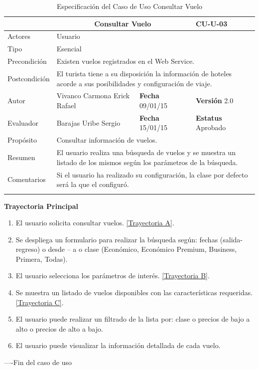 \begin{longtable}{|p{2.5cm}|p{6.4cm}|p{2cm}|p{2cm}|}
	\hline
		\rowcolor[RGB]{51,153,255}{Caso de Uso}&\multicolumn{2}{c}{Consultar Vuelo}&{\textbf{CU-U-03}}\\
	\hline
		{Actores}&\multicolumn{3}{p{11.2cm}|}{Usuario}\\
	\hline
		{Tipo}&\multicolumn{3}{p{11.2cm}|}{Esencial}\\
	\hline
		{Precondición}&\multicolumn{3}{p{11.2cm}|}{Existen vuelos registrados en el Web Service.}\\
	\hline
		{Postcondición}&\multicolumn{3}{p{11.2cm}|}{El turista tiene a su disposición la información de hoteles acorde a sus posibilidades y configuración de viaje.}\\
	\hline
		{Autor}&{Vivanco Carmona Erick Rafael}&{\textbf{Fecha} 09/01/15}&{\textbf{Versión} 2.0}\\
			\hline
		{Evaluador}&{Barajas Uribe Sergio}&{\textbf{Fecha} 15/01/15}&{\textbf{Estatus} Aprobado}\\
	\hline
		{Propósito}&\multicolumn{3}{p{11.2cm}|}{Consultar información de vuelos.}\\
	\hline
		{Resumen}&\multicolumn{3}{p{11.2cm}|}{El usuario realiza una búsqueda de vuelos y se muestra un listado de los mismos según los parámetros de la búsqueda.}\\	
	\hline
		{Comentarios}&\multicolumn{3}{p{11.2cm}|}{Si el usuario ha realizado su configuración, la clase por defecto será la que el configuró.}\\	
	\hline
	\caption[Especificación del Caso de Uso Consultar Vuelo]{Especificación del Caso de Uso Consultar Vuelo}
    	\label{tab:cuConsultarVuelo}
\end{longtable}
\newpage
\begin{flushleft}
	\textbf{Trayectoria Principal}\\
	\begin{enumerate}
		\item El usuario solicita consultar vuelos. \hyperlink{TrayectoriaA_CU-U-03}{[Trayectoria A]}.
		\item Se despliega un formulario para realizar la búsqueda según: fechas (salida- regreso) o desde – a o clase (Económico, Económico Premium, Business, Primera, Todas).
		\item El usuario selecciona los parámetros de interés. \hyperlink{TrayectoriaB_CU-U-03}{[Trayectoria B]}.
		\item Se  muestra un listado de vuelos disponibles con las características requeridas. \hyperlink{TrayectoriaC_CU-U-03}{[Trayectoria C]}.
		\item El usuario puede realizar un filtrado de la lista por: clase o precios de bajo a alto o precios de alto a bajo.
		\item	El usuario puede visualizar la información detallada de cada vuelo.
	\end{enumerate}
\end{flushleft}
----Fin del caso de uso

